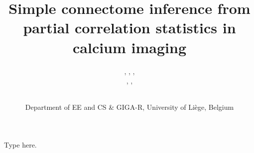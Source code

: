 \documentclass[wcp]{jmlr}
\title{Simple connectome inference from partial correlation statistics in calcium imaging}
\author{\Name{Antonio Sutera},
   \Name{Arnaud Joly},
   \Name{Vincent François-Lavet}, \Email{a.sutera@ulg.ac.be}\\
   \Name{Zixiao Aaron Qiu},
   \Name{Gilles Louppe},
   \Name{Damien Ernst}\and\Name{Pierre Geurts}
    \\
   \addr Department of EE and CS \& GIGA-R, University of Li\`ege, Belgium}
\begin{document}
Type here.
\end{document}
